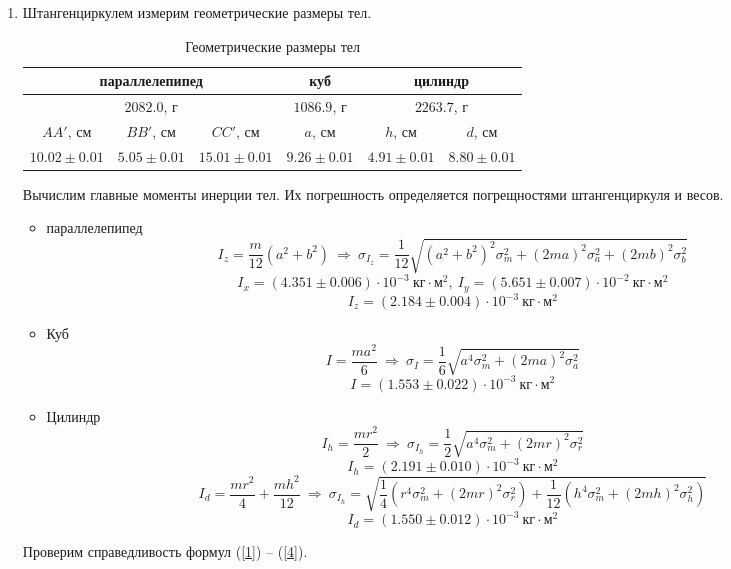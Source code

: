 \documentclass[a4paper,12pt]{article}
\begin{document}
\begin{enumerate}
    \item Штангенциркулем измерим геометрические размеры тел.
    \begin{table}[!h]
        \centering
        \begin{tabular}{|c|c|c|c|c|c|} \hline
            \multicolumn{3}{|c|}{параллелепипед} & куб & \multicolumn{2}{|c|}{цилиндр} \\ \hline
            \multicolumn{3}{|c|}{$2082.0$, г} & $1086.9$, г & \multicolumn{2}{|c|}{$2263.7$, г} \\ \hline
            $AA'$, см & $BB'$, см & $CC'$, см & $a$, см & $h$, см & $d$, см \\ \hline
            $10.02\pm0.01$ & $5.05\pm0.01$ & $15.01\pm0.01$ & $9.26\pm0.01$ & $4.91\pm0.01$ & $8.80\pm0.01$ \\ \hline
        \end{tabular}
        \caption{Геометрические размеры тел}
    \end{table}
    Вычислим главные моменты инерции тел. Их погрешность определяется погрещностями штангенциркуля и весов.
    \begin{itemize}
        \item параллелепипед
        $$
        I_z = \frac{m}{12}(a^2 + b^2)~\Rightarrow~\sigma_{I_z} = \frac{1}{12}\sqrt{\left(a^2+b^2\right)^2\sigma^2_m + (2ma)^2\sigma^2_a + (2mb)^2\sigma^2_b}
        $$
        $$
        I_x = (4.351\pm 0.006)\cdot 10^{-3}~\text{кг$\cdot$м$^2$},~I_y = (5.651\pm 0.007)\cdot 10^{-2}~\text{кг$\cdot$м$^2$}
        $$
        $$
        I_z = (2.184\pm 0.004)\cdot 10^{-3}~\text{кг$\cdot$м$^2$}
        $$
        \item Куб
        $$
        I = \frac{ma^2}{6}~\Rightarrow~\sigma_I = \frac{1}{6}\sqrt{a^4\sigma^2_m + (2ma)^2\sigma^2_a}
        $$
        $$
        I = (1.553\pm 0.022)\cdot 10^{-3}~\text{кг$\cdot$м$^2$}
        $$
        \item Цилиндр
        $$
        I_h = \frac{mr^2}{2}~\Rightarrow~\sigma_{I_h} = \frac{1}{2}\sqrt{a^4\sigma^2_m + (2mr)^2\sigma^2_r}
        $$
        $$
        I_h = (2.191\pm 0.010)\cdot 10^{-3}~\text{кг$\cdot$м$^2$}
        $$
        $$
        I_d = \frac{mr^2}{4} + \frac{mh^2}{12}~\Rightarrow~\sigma_{I_h} = \sqrt{\frac{1}{4}(r^4\sigma^2_m + (2mr)^2\sigma^2_r) + \frac{1}{12}(h^4\sigma^2_m + (2mh)^2\sigma^2_h)}
        $$
        $$
        I_d = (1.550\pm 0.012)\cdot 10^{-3}~\text{кг$\cdot$м$^2$}
        $$
    \end{itemize}
    Проверим справедливость формул (\ref{1}) -- (\ref{4}).

\end{enumerate}
\end{document}
